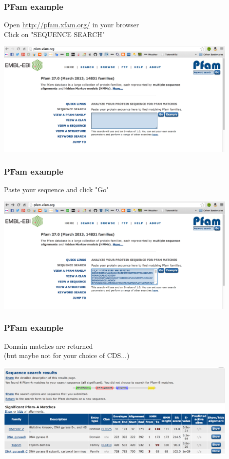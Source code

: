     \begin{frame}
      \frametitle{PFam example}  
      Open \url{http://pfam.xfam.org/} in your browser \\
      Click on "SEQUENCE SEARCH"
      \begin{center}
        \includegraphics[width=0.9\textwidth]{images/pfam7} 
      \end{center}      
    \end{frame}

    \begin{frame}
      \frametitle{PFam example}  
      Paste your sequence and click "Go"
      \begin{center}
        \includegraphics[width=0.9\textwidth]{images/pfam8} 
      \end{center}      
    \end{frame}

    \begin{frame}
      \frametitle{PFam example}  
      Domain matches are returned \\
      (but maybe not for your choice of CDS$\ldots$)
      \begin{center}
        \includegraphics[width=0.9\textwidth]{images/pfam9} 
      \end{center}      
    \end{frame}

